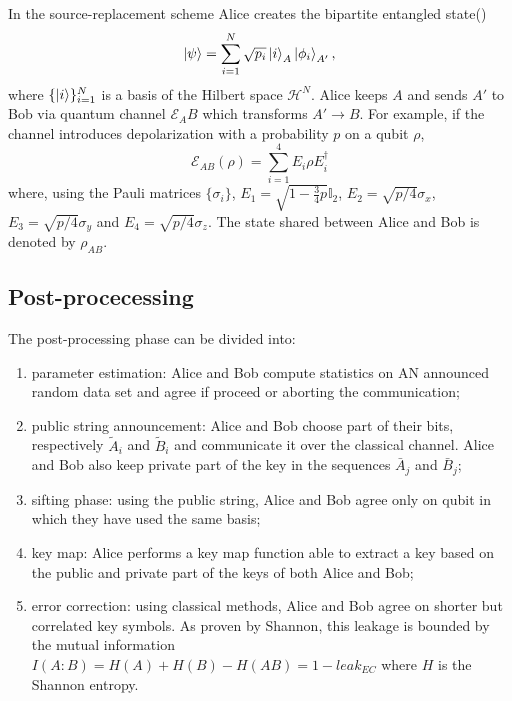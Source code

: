\documentclass{article}
\begin{document}
    In the source-replacement scheme Alice creates the bipartite entangled state(\cite{Ferenczi_2012})
    \[
        \ket{\psi} = \sum_{i=1}^N\sqrt{p_i}\ket{i}_A\ket{\phi_i}_{A'},
    \]
    where \(\{\ket{i}\}_{i=1}^N\) is a basis of the Hilbert space \(\mathcal{H}^N\).
    Alice keeps \(A\) and sends \(A'\) to Bob via quantum channel \(\mathcal{E}_AB\) which transforms \(A'\to B\).
    For example, if the channel introduces depolarization with a probability \(p\) on a qubit \(\rho\),
    \begin{equation}
        \mathcal{E}_{AB}(\rho) = \sum_{i=1}^4 E_i \rho E_i^{\dagger}
        \label{eqn:depolarizing-channel}
    \end{equation}
    where, using the Pauli matrices \(\{\sigma_i\}\), \(E_1=\sqrt{1-\frac{3}{4}p}\mathbb{I}_2\), \(E_2 = \sqrt{p/4}\sigma_x\), \(E_3 = \sqrt{p/4}\sigma_y\) and \(E_4 = \sqrt{p/4}\sigma_z\).
    The state shared between Alice and Bob is denoted by \(\rho_{AB}\).

    \subsection{Post-procecessing}
    The post-processing phase can be divided into:
    \begin{enumerate}
        \item parameter estimation: Alice and Bob compute statistics on AN announced random data set and agree if proceed or aborting the communication;
        \item public string announcement: Alice and Bob choose part of their bits, respectively \(\tilde{A}_i\) and \(\tilde{B}_i\) and communicate it over the classical channel. Alice and Bob also keep private part of the key in the sequences \(\bar{A}_{j}\) and \(\bar{B}_j\);
        \item sifting phase: using the public string, Alice and Bob agree only on qubit in which they have used the same basis;
        \item key map: Alice performs a key map function able to extract a key based on the public and private part of the keys of both Alice and Bob;
        \item error correction: using classical methods, Alice and Bob agree on shorter but correlated key symbols. As proven by Shannon, this leakage is bounded by the mutual information \(I(A:B)=H(A)+H(B)-H(AB)=1-leak_{EC}\) where \(H\) is the Shannon entropy.
    \end{enumerate}
\end{document}
